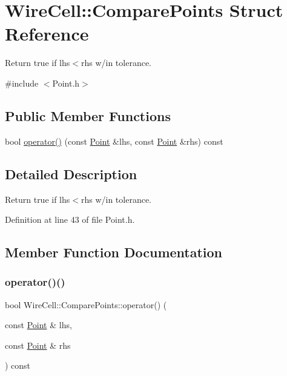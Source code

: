 \hypertarget{struct_wire_cell_1_1_compare_points}{}\section{Wire\+Cell\+:\+:Compare\+Points Struct Reference}
\label{struct_wire_cell_1_1_compare_points}


Return true if lhs$<$rhs w/in tolerance.  




{\ttfamily \#include $<$Point.\+h$>$}

\subsection*{Public Member Functions}
\begin{DoxyCompactItemize}
\item 
bool \hyperlink{struct_wire_cell_1_1_compare_points_ae6ab32afd52b312e3d452e68996fca76}{operator()} (const \hyperlink{namespace_wire_cell_ab2b2565fa6432efbb4513c14c988cda9}{Point} \&lhs, const \hyperlink{namespace_wire_cell_ab2b2565fa6432efbb4513c14c988cda9}{Point} \&rhs) const
\end{DoxyCompactItemize}


\subsection{Detailed Description}
Return true if lhs$<$rhs w/in tolerance. 

Definition at line 43 of file Point.\+h.



\subsection{Member Function Documentation}
\mbox{\label{struct_wire_cell_1_1_compare_points_ae6ab32afd52b312e3d452e68996fca76}} 
\subsubsection{\texorpdfstring{operator()()}{operator()()}}
{\footnotesize\ttfamily bool Wire\+Cell\+::\+Compare\+Points\+::operator() (\begin{DoxyParamCaption}\item[{const \hyperlink{namespace_wire_cell_ab2b2565fa6432efbb4513c14c988cda9}{Point} \&}]{lhs,  }\item[{const \hyperlink{namespace_wire_cell_ab2b2565fa6432efbb4513c14c988cda9}{Point} \&}]{rhs }\end{DoxyParamCaption}) const}



